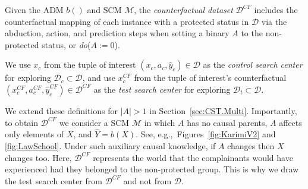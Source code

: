 %
\begin{definition}
\label{def:CounterDataset}
    Given the ADM $b()$ and SCM $\mathcal{M}$, the \textit{counterfactual dataset} $\mathcal{D}^{CF}$ includes the counterfactual mapping of each instance with a protected status in $\mathcal{D}$ via the abduction, action, and prediction steps when setting a binary $A$ to the non-protected status, or \textit{do}($A:=0$).
\end{definition}
%

%
\begin{definition}
\label{def:SearchCenters}
    We use $x_c$ from the tuple of interest $(x_c, a_c, \hat{y}_c) \in \mathcal{D}$ as the \textit{control search center} for exploring $\mathcal{D}_c \subset \mathcal{D}$, and use $x_c^{CF}$ from the tuple of interest's counterfactual $(x_c^{CF}, a_c^{CF}, \hat{y}_c^{CF}) \in \mathcal{D}^{CF}$ as the \textit{test search center} for exploring $\mathcal{D}_t \subset \mathcal{D}$.
\end{definition}
%

We extend these definitions for $|A| > 1$ in Section~\ref{sec:CST.Multi}.
Importantly, to obtain $\mathcal{D}^{CF}$ we consider a SCM $\mathcal{M}$ in which $A$ has no causal parents, $A$ affects only elements of $X$, and $\hat{Y}=b(X)$.
See, e.g.,~Figures~\ref{fig:KarimiV2} and \ref{fig:LawSchool}.
Under such auxiliary causal knowledge, if $A$ changes then $X$ changes too. 
Here, $\mathcal{D}^{CF}$
represents the world that the complainants would have experienced had they belonged to the non-protected group. 
This is why we draw the test search center from $\mathcal{D}^{CF}$ and not from $\mathcal{D}$. 

